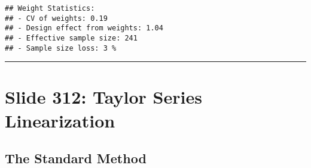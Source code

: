 \documentclass[
]{article}
\begin{document}
\begin{verbatim}
## Weight Statistics:
## - CV of weights: 0.19 
## - Design effect from weights: 1.04 
## - Effective sample size: 241 
## - Sample size loss: 3 %
\end{verbatim}

\begin{center}\rule{0.5\linewidth}{0.5pt}\end{center}

\section{Slide 312: Taylor Series
Linearization}\label{slide-312-taylor-series-linearization}

\subsection{The Standard Method}\label{the-standard-method}
\end{document}
